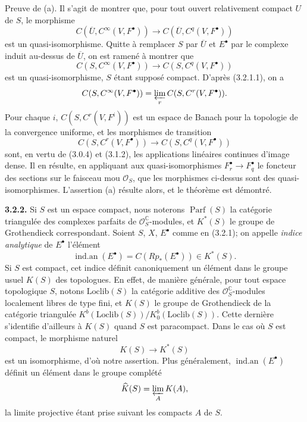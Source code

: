 \documentclass[11pt]{article}
\newcommand{\Parf}{\operatorname{Parf}}
\providecommand{\cO}{\mathcal O}
\begin{document}
Preuve de (a). Il s'agit de montrer que, pour tout ouvert relativement compact $U$ de $S$, le morphisme
\[
  C(\overline U,C^\infty(V,F^\bullet))
  \longrightarrow C(\overline U,C^q(V,F^\bullet))
\]
est un quasi-isomorphisme. Quitte à remplacer $S$ par $\overline U$ et $E^\bullet$ par le complexe induit au-dessus de $\overline U$, on est ramené à montrer que
\[
  C(S,C^\infty(V,F^\bullet))
  \longrightarrow C(S,C^q(V,F^\bullet))
\]
est un quasi-isomorphisme, $S$ étant supposé compact. D'après (3.2.1.1), on a
\[
  C(S,C^\infty(V,F^\bullet))=
  \varprojlim_r C(S,C^r(V,F^\bullet)).
\]
Pour chaque $i$, $C(S,C^r(V,F^i))$ est un espace de Banach pour la topologie de la convergence uniforme, et les morphismes de transition
\[
  C(S,C^r(V,F^\bullet))\longrightarrow C(S,C^q(V,F^\bullet))
\]
sont, en vertu de (3.0.4) et (3.1.2), les applications linéaires continues d'image dense. Il en résulte, en appliquant aux quasi-isomorphismes $F_r^\bullet\to F_q^\bullet$ le foncteur des sections sur le faisceau mou $\cO_S$, que les morphismes ci-dessus sont des quasi-isomorphismes. L'assertion (a) résulte alors, et le théorème est démontré.

\textbf{3.2.2.} Si $S$ est un espace compact, nous noterons $\Parf(S)$ la catégorie triangulée des complexes parfaits de $\cO_S^\mathbb C$-modules, et $K^*(S)$ le groupe de Grothendieck correspondant. Soient $S$, $X$, $E^\bullet$ comme en (3.2.1); on appelle \emph{indice analytique} de $E^\bullet$ l'élément
\[
  \operatorname{ind.an}(E^\bullet)=C(Rp_*(E^\bullet))\in K^*(S).
\]
Si $S$ est compact, cet indice définit canoniquement un élément dans le groupe usuel $K(S)$ des topologues. En effet, de manière générale, pour tout espace topologique $S$, notons $\mathrm{Loclib}(S)$ la catégorie additive des $\cO_S^\mathbb C$-modules localement libres de type fini, et $K(S)$ le groupe de Grothendieck de la catégorie triangulée $K^b(\mathrm{Loclib}(S))/K^b_0(\mathrm{Loclib}(S))$. Cette dernière s'identifie d'ailleurs à $K(S)$ quand $S$ est paracompact. Dans le cas où $S$ est compact, le morphisme naturel
\[
  K(S)\longrightarrow K^*(S)
\]
est un isomorphisme, d'où notre assertion. Plus généralement, $\operatorname{ind.an}(E^\bullet)$ définit un élément dans le groupe complété
\[
  \widehat K(S)=\varprojlim_A K(A),
\]
la limite projective étant prise suivant les compacts $A$ de $S$.
\end{document}
